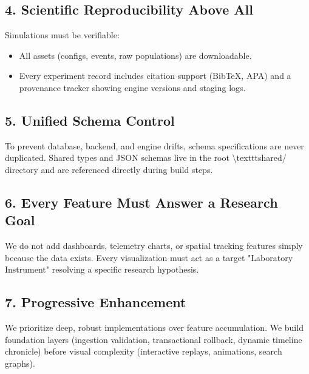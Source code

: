 \documentclass[11pt,a4paper]{article}
\begin{document}
\subsection*{4. Scientific Reproducibility Above All}
Simulations must be verifiable:
\begin{itemize}
  \item All assets (configs, events, raw populations) are downloadable.
  \item Every experiment record includes citation support (BibTeX, APA) and a provenance tracker showing engine versions and staging logs.
\end{itemize}

\subsection*{5. Unified Schema Control}
To prevent database, backend, and engine drifts, schema specifications are never duplicated. Shared types and JSON schemas live in the root \textbackslash{}texttt{shared/} directory and are referenced directly during build steps.

\subsection*{6. Every Feature Must Answer a Research Goal}
We do not add dashboards, telemetry charts, or spatial tracking features simply because the data exists. Every visualization must act as a target "Laboratory Instrument" resolving a specific research hypothesis.

\subsection*{7. Progressive Enhancement}
We prioritize deep, robust implementations over feature accumulation. We build foundation layers (ingestion validation, transactional rollback, dynamic timeline chronicle) before visual complexity (interactive replays, animations, search graphs).
\end{document}
